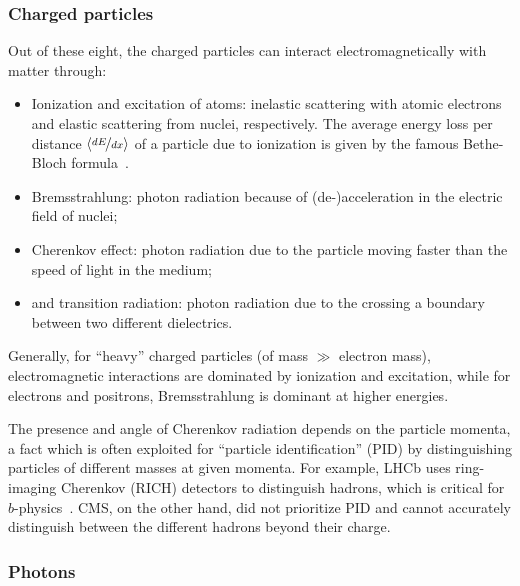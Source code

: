 \subsubsection{Charged particles}

Out of these eight, the charged particles can interact electromagnetically with matter through:
\begin{itemize}
    \item Ionization and excitation of atoms: inelastic scattering with atomic electrons and elastic scattering from nuclei, respectively.
    The average energy loss per distance $\left\langle \nicefrac{dE}{dx}\right\rangle$ of a particle due to ionization is given by the famous Bethe-Bloch formula~\cite{bethe1953passage}.
    \item Bremsstrahlung: photon radiation because of (de-)acceleration in the electric field of nuclei;
    \item Cherenkov effect: photon radiation due to the particle moving faster than the speed of light in the medium;
    \item and transition radiation: photon radiation due to the crossing a boundary between two different dielectrics.
\end{itemize}
Generally, for ``heavy'' charged particles (of mass $\gg$ electron mass), electromagnetic interactions are dominated by ionization and excitation, while for electrons and positrons, Bremsstrahlung is dominant at higher energies.

The presence and angle of Cherenkov radiation depends on the particle momenta, a fact which is often exploited for ``particle identification'' (PID) by distinguishing particles of different masses at given momenta.
For example, LHCb uses ring-imaging Cherenkov (RICH) detectors to distinguish hadrons, which is critical for $b$-physics~\cite{LHCb:2008vvz}.
CMS, on the other hand, did not prioritize PID and cannot accurately distinguish between the different hadrons beyond their charge.


\subsubsection{Photons}

